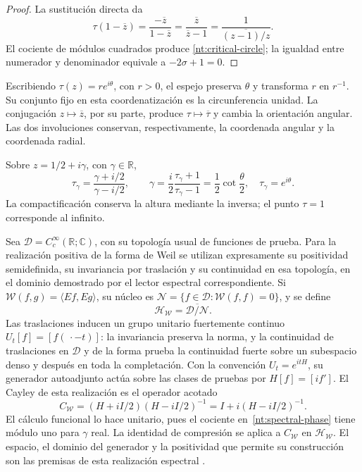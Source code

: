 \begin{proof}
La sustitución directa da
\[
 \tau(1-\overline z)
 =\frac{-\overline z}{1-\overline z}
 =\frac{\overline z}{\overline z-1}
 =\frac1{\overline{(z-1)/z}}.
\]
El cociente de módulos cuadrados produce
\eqref{nt:critical-circle}; la igualdad entre numerador y
denominador equivale a \(-2\sigma+1=0\).
\end{proof}

Escribiendo \(\tau(z)=r e^{i\theta}\), con \(r>0\), el
espejo preserva \(\theta\) y transforma \(r\) en \(r^{-1}\).
Su conjunto fijo en esta coordenatización es la circunferencia unidad.
La conjugación \(z\mapsto\overline z\), por su parte,
produce \(\tau\mapsto\overline\tau\) y cambia la orientación
angular. Las dos involuciones conservan, respectivamente,
la coordenada angular y la coordenada radial.

Sobre \(z=1/2+i\gamma\), con \(\gamma\in\mathbb R\),
\begin{equation}
 \tau_\gamma=\frac{\gamma+i/2}{\gamma-i/2},
 \qquad
 \gamma=\frac{i}{2}\frac{\tau_\gamma+1}{\tau_\gamma-1}
       =\frac12\cot\frac{\theta}{2},
 \quad \tau_\gamma=e^{i\theta}.
 \label{nt:spectral-phase}
\end{equation}
La compactificación conserva la altura mediante la inversa;
el punto \(\tau=1\) corresponde al infinito.

Sea \(\mathcal D=C_c^\infty(\mathbb R;\mathbb C)\), con su topología
usual de funciones de prueba. Para la realización positiva de la forma
de Weil se utilizan expresamente su positividad semidefinida, su
invariancia por traslación y su continuidad en esa topología, en el
dominio demostrado por el lector espectral correspondiente. Si
\(\mathscr W(f,g)=\langle Ef,Eg\rangle\), su núcleo es
\(\mathcal N=\{f\in\mathcal D:\mathscr W(f,f)=0\}\), y se define
\[
 \mathcal H_{\mathscr W}
 =\overline{\mathcal D/\mathcal N}.
\]
Las traslaciones inducen un grupo unitario fuertemente
continuo \(U_t[f]=[f(\,\cdot-t)]\): la invariancia preserva la norma,
y la continuidad de traslaciones en \(\mathcal D\) y de la forma
prueba la continuidad fuerte sobre un subespacio denso y después en
toda la completación. Con la convención
\(U_t=e^{itH}\), su generador autoadjunto actúa sobre
las clases de pruebas por \(H[f]=[if']\). El Cayley de
esta realización es el operador acotado
\begin{equation}
 C_{\mathscr W}
 =(H+iI/2)(H-iI/2)^{-1}
 =I+i(H-iI/2)^{-1}.
 \label{nt:cayley-hilbert}
\end{equation}
El cálculo funcional lo hace unitario, pues el cociente
en~\eqref{nt:spectral-phase} tiene módulo uno para
\(\gamma\) real. La identidad de compresión se aplica
a \(C_{\mathscr W}\) en \(\mathcal H_{\mathscr W}\).
El espacio, el dominio del generador y la positividad
que permite su construcción son las premisas de esta
realización espectral \cite{HMT-VIII}.

